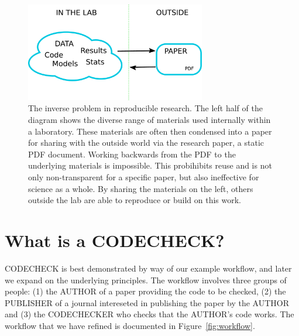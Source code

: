 \documentclass[12pt]{article}
\begin{document}
\begin{figure}
  \centering
  \includegraphics[width=0.7\textwidth]{figs/rr.pdf}
  \caption{The inverse problem in reproducible research.  The left
  half of the diagram shows the diverse range of materials used
  internally within a laboratory.  These materials are often then
  condensed into a paper for sharing with the outside world via the
  research paper, a static PDF document.  Working backwards from the
  PDF to the underlying materials is impossible. This probihibits reuse
  and is not only non-transparent for a specific paper, but also 
  ineffective for science as a whole. By sharing the
  materials on the left, others outside the lab are able to reproduce
  or build on this work.}
  \label{fig:inverse}
\end{figure}

\section*{What is a CODECHECK?}\label{what-is-a-codecheck}

CODECHECK is best demonstrated by way of our example workflow, and later
we expand on the underlying principles. The workflow involves three
groups of people: (1) the AUTHOR of a paper providing the code to be checked, (2)
the PUBLISHER of a journal intereseted in publishing the paper by the
AUTHOR and (3) the CODECHECKER who checks that the AUTHOR's code works.
The workflow that we have refined is documented in Figure~\ref{fig:workflow}.

\end{document}
